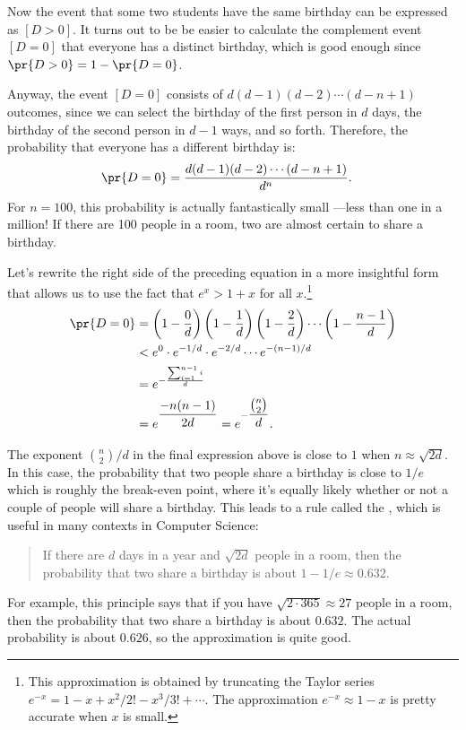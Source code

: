 Now the event that some two students have the same birthday can be
expressed as $[D>0]$.  It turns out to be be easier to calculate the
complement event $[D=0]$ that everyone has a distinct birthday, which is
good enough since $\pr{D>0} = 1 - \pr{D=0}$.

Anyway, the event $[D=0]$ consists of $d (d - 1) (d - 2) \cdots (d - n +
1)$ outcomes, since we can select the birthday of the first person in $d$
days, the birthday of the second person in $d - 1$ ways, and so forth.
Therefore, the probability that everyone has a different birthday is:
\begin{align*}
\pr{D=0} & = \frac{d (d - 1) (d - 2) \cdots (d - n + 1)}{d^n}.
\end{align*}
For $n=100$, this probability is actually fantastically small ---less
than one in a million!  If there are 100 people in a room, two are
almost certain to share a birthday.

Let's rewrite the right side of the preceding equation in a more
insightful form that allows us to use the fact that $e^x >1+x$ for all
$x$.\footnote{This approximation is obtained by truncating the Taylor
series $e^{-x} = 1 - x + x^2/2! - x^3/3! + \cdots$.  The approximation
$e^{-x} \approx 1 - x$ is pretty accurate when $x$ is small.}
\begin{align*}
\pr{D=0} & = \left(1 - \frac{0}{d}\right)
           \left(1 - \frac{1}{d}\right)
           \left(1 - \frac{2}{d}\right) 
           \cdots
           \left(1 - \frac{n - 1}{d}\right)\\
       & < e^0 \cdot e^{-1/d} \cdot e^{-2/d} \cdots e^{-(n-1)/d} \\
       & = e^{-\frac{\sum_{i=1}^{n-1} i}{d}}\\
       & = e^{\dfrac{-n(n-1)}{2d}} = e^{-\dfrac{\binom{n}{2}}{d}}.
\end{align*}

The exponent $\binom{n}{2}/d$ in the final expression above is close to
$1$ when $n \approx \sqrt{2d}$.  In this case, the probability that two
people share a birthday is close to $1/e$ which is roughly the break-even
point, where it's equally likely whether or not a couple of people will
share a birthday.  This leads to a rule called the , which is useful in many contexts in Computer Science:
\begin{quote}
If there are $d$ days in a year and $\sqrt{2d}$ people in a
room, then the probability that two share a birthday is about 
$1 - 1/e \approx 0.632$.
\end{quote}
For example, this principle says that if you have $\sqrt{2 \cdot 365}
\approx 27$ people in a room, then the probability that two share a
birthday is about $0.632$.  The actual probability is about $0.626$,
so the approximation is quite good.

